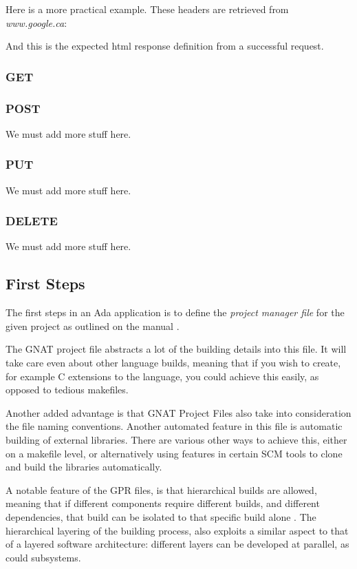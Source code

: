 Here is a more practical example. These headers are retrieved from \textit{www.google.ca}:


And this is the expected html response definition from a successful request.


\subsubsection{GET} 

\subsubsection{POST}
We must add more stuff here.

\subsubsection{PUT}
We must add more stuff here.

\subsubsection{DELETE} 
We must add more stuff here.

\subsection{First Steps}
The first steps in an Ada application is to define the \textit{project manager 
file} for the given project as outlined on the manual \cite{GNATintro}.

The GNAT project file abstracts a lot of the building details into this file. It will take care even about other language builds, meaning that if you wish to create, for example C extensions to the language, you could achieve this easily, as opposed to tedious makefiles. 

Another added advantage is that GNAT Project Files also take into consideration the file naming conventions. Another automated feature in this file is automatic building of external libraries. There are various other ways to achieve this, either on a makefile level, or alternatively using features in certain SCM tools to clone and build the libraries automatically. 

A notable feature of the GPR files, is that hierarchical builds are allowed, meaning that if different components require different builds, and different dependencies, that build can be isolated to that specific build alone \cite{GNATintro}. The hierarchical layering of the building process, also exploits a similar aspect to that of a layered software architecture: different layers can be developed at parallel, as could subsystems. 
